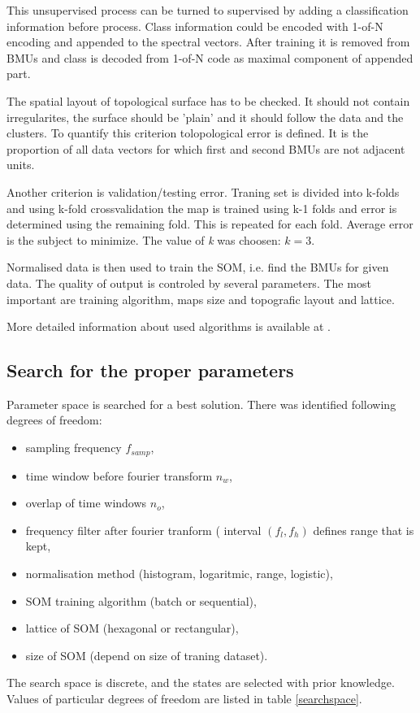 \documentclass[a4paper]{IEEEtran}
\begin{document}
This unsupervised process can be turned to supervised by adding a classification
information before process.
Class information  could be encoded with 1-of-N encoding and appended to the 
spectral vectors. After training it is removed from BMUs and class is 
decoded from 1-of-N code as maximal component of appended part.

The spatial 
layout of topological surface has to be checked. It should not contain irregularites, 
the surface should be 'plain' and it should follow the data and the clusters.
To quantify this criterion tolopological error is defined. It is the proportion 
of all data vectors for which first and second BMUs are not adjacent units.

Another criterion is validation/testing error. Traning set is divided into k-folds
and using k-fold crossvalidation the map is trained using k-1 folds and  error 
is determined using the remaining fold. This is repeated for each fold. Average error is 
the subject to minimize. The value of \textit{k} was choosen: $ k = 3 $.

Normalised data is then used to train the SOM, i.e. find the BMUs for given data.
The quality of output is controled by several parameters. The most important are 
training algorithm, maps size and topografic layout and lattice.

More detailed information about used algorithms is available at \cite{somtoolbox}.

\subsection{Search for the proper parameters}
Parameter space is searched for a best solution. There was identified
following degrees of freedom:
\begin{itemize}
	\item sampling frequency $ f_{samp} $,
	\item time window before fourier transform $ n_w $,
	\item overlap of time windows $ n_o $,
	\item frequency filter after fourier tranform ( interval $ (f_l, f_h) $ defines 
	range that is kept,
	\item normalisation method (histogram, logaritmic, range, logistic),
	\item SOM training algorithm (batch or sequential),
	\item lattice of SOM (hexagonal or rectangular),
	\item size of SOM (depend on size of traning dataset).
\end{itemize}
The search space is discrete, and the states are selected with prior knowledge.
Values of particular degrees of freedom are listed  in table \ref{searchspace}.
\end{document}
